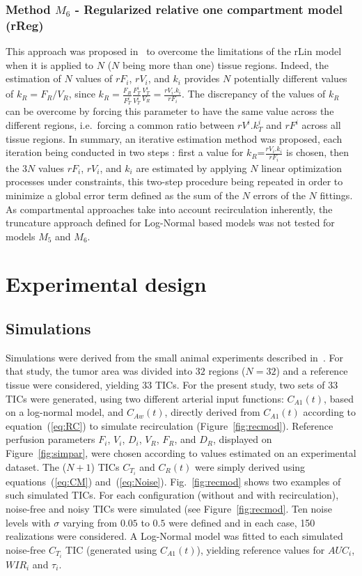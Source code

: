 \subsubsection{Method $M_6$ - Regularized relative one compartment model (rReg)}
This approach was proposed in~\cite{Doury2016fi} to overcome the limitations of the rLin model when it is applied to $N$ ($N$ being more than one) tissue regions. Indeed, the estimation of $N$ values of $rF_i$, $rV_i$, and $k_i$ provides $N$ potentially different values of $k_R = F_R/V_R$, since $k_R = \frac{F_R}{F_T^i}\frac{F_T^i}{V_T^i}\frac{V_T^i}{V_R} = \frac{rV_i.k_i}{rF_i}$.
The discrepancy of the values of $k_R$ can be overcome by forcing this parameter to have the same value across the different regions, i.e.~forcing a common ratio between $rV^i.k^i_T$ and $rF^i$ across all tissue regions. In summary, an iterative estimation method was proposed, each iteration being conducted in two steps : first a value for $k_R$=$\frac{rV_i.k_i}{rF_i}$ is chosen, then the $3N$ values $rF_i$, $rV_i$, and $k_i$ are estimated by applying $N$ linear optimization processes under constraints, this two-step procedure being repeated in order to minimize a global error term defined as the sum of the $N$ errors of the $N$ fittings.
As compartmental approaches take into account recirculation inherently, the  truncature approach defined for Log-Normal based models was not tested for models $M_5$ and $M_6$. 

\section{Experimental design}

\subsection{Simulations}
Simulations were derived from the small animal experiments described in~\cite{Doury2017wn}. For that study, the tumor area was divided into $32$ regions ($N=32$) and a reference tissue were considered, yielding $33$ TICs. For the present study, two sets of 33 TICs were generated, using two different arterial input functions: $C_{A1}(t)$, based on a log-normal model, and $C_{Aw}(t)$, directly derived from $C_{A1}(t)$ according to equation~(\ref{eq:RC}) to simulate recirculation (Figure~\ref{fig:recmod}).
Reference perfusion parameters $F_i$, $V_i$, $D_i$, $V_R$, $F_R$, and $D_R$, displayed on Figure~\ref{fig:simpar}, were chosen according to values estimated on an experimental dataset. The ($N+1$) TICs $C_{T_i}$ and $C_R(t)$ were simply derived using equations~(\ref{eq:CM}) and~(\ref{eq:Noise}). Fig.~\ref{fig:recmod} shows two examples of such simulated TICs.
For each configuration (without and with recirculation), noise-free and noisy TICs were simulated (see Figure~\ref{fig:recmod}. Ten noise levels with $\sigma$ varying from $0.05$ to $0.5$ were defined and in each case, 150 realizations were considered.
A Log-Normal model was fitted to each simulated noise-free $C_{T_i}$ TIC (generated using $C_{A1}(t)$), yielding reference values for $AUC_i$, $WIR_i$ and $\tau_i$. 

